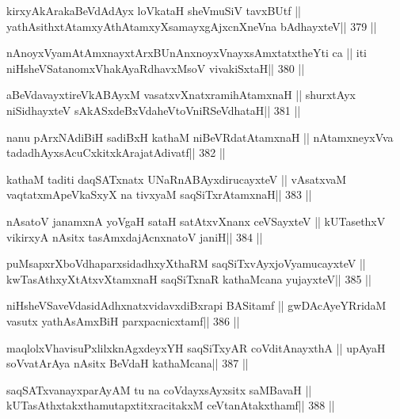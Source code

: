 \begin{shl}
kirxyAkArakaBeVdAdAyx loVkataH sheVmuSiV tavxBUtf ||
yathAsithxtAtamxyAthAtamxyXsamayxgAjxcnXneVna bAdhayxteV\hfill || 379 ||
\end{shl}

\begin{shl}
nAnoyxV\s yamAtAmx\s nayxtArxBUnAnxnoyxV\s nayxsAmxtatxtheYti ca ||
iti niHsheVSatanomxVhakAyaRdhavxMsoV vivakiSxtaH\hfill || 380 ||
\end{shl}

\begin{shl}
aBeVdavayxtireVkABAyxM vasatxvXnatxramihA\s\s tamxnaH ||
shurxtAyx niSidhayxteV sAkASxdeBxVdaheVtoVniRSeVdhataH\hfill || 381 ||
\end{shl}

\begin{shl}
nanu pArxNAdiBiH sadiBxH kathaM niBeVRdatA\s\s tamxnaH ||
nA\s\s tamxneyxVva tadadhAyxsAcuCxkitxkArajatAdivatf\hfill || 382 ||
\end{shl}

\begin{shl}
kathaM taditi daqSATxnatx UNaRnABAyxdirucayxteV ||
vAsatxvaM vaqtatxmApeVkaSxyX na tivxyaM saqSiTxrAtamxnaH\hfill || 383 ||
\end{shl}

\begin{shl}
nAsatoV janamxnA yoVgaH sataH satAtxvXnanx ceVSayxteV ||
kUTasethxV vikirxyA nAsitx tasAmxdajAcnxnatoV janiH\hfill || 384 ||
\end{shl}

\begin{shl}
puMsapxrXboVdhaparxsidadhxyXthaRM saqSiTxvAyxjoV\s yamucayxteV ||
kwTasAthxyXtAtxvXtamxnaH saqSiTxnaR kathaMcana yujayxteV\hfill || 385 ||
\end{shl}

\begin{shl}
niHsheVSaveVdasidAdhxnatxvidavxdiBxrapi BASitamf ||
gwDAcAyeYRridaM vasutx yathA\s sAmxBiH parxpacnicxtamf\hfill || 386 ||
\end{shl}

\begin{shl}
maqlolxVhavisuPxlilxknAgxdeyxYH saqSiTxyAR coVditA\s nayxthA ||
upAyaH soV\s vatArAya nAsitx BeVdaH kathaMcana\hfill || 387 ||
\end{shl}

\begin{shl}
saqSATxvanayxparAyAM tu na coVdayxsAyxsitx saMBavaH ||
kUTasAthxtakxthamutapxtitxracitakxM ceVtanAtakxthamf\hfill || 388 ||
\end{shl}

